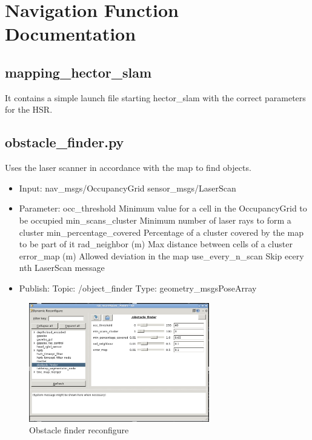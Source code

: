 \documentclass[main.tex]{subfiles}
\begin{document}
	\begingroup

	\renewcommand{\cleardoublepage}{}

	\renewcommand{\clearpage}{}

	\chapter{Navigation Function Documentation}

		
		\section{mapping\_hector\_slam}
		It contains a simple launch file starting hector\_slam with the correct parameters for the HSR.
		
		\section{obstacle\_finder.py}\label{met_obstacle_finder}
		Uses the laser scanner in accordance with the map to find objects.
		
		\begin{itemize}
			\item Input: 
				\subitem nav\_msgs/OccupancyGrid
				\subitem sensor\_msgs/LaserScan
			\item Parameter:
				\subitem occ\_threshold 
				Minimum value for a cell in the OccupancyGrid to be occupied
				\subitem min\_scans\_cluster
				Minimum number of laser rays to form a cluster
				\subitem min\_percentage\_covered
				Percentage of a cluster covered by the map to be part of it
				\subitem rad\_neighbor (m)
				Max distance between cells of a cluster
				\subitem error\_map (m)
				Allowed deviation in the map
				\subitem use\_every\_n\_scan
				Skip ecery nth LaserScan message 
			\item  Publish:
				\subitem Topic: /object\_finder
				\subitem Type: geometry\_msgsPoseArray
		\end{itemize}
	
		\begin{figure}[H]
			\centering
			\includegraphics[width=0.7\textwidth]{pictures/obstacle_finder/of_reconfigure.png}
			\caption{Obstacle finder reconfigure}
			\label{img_of_reconfigure}
		\end{figure}
	
\end{document}
